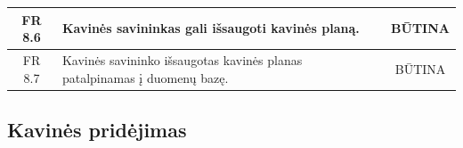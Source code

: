 \documentclass{VUMIFPSkursinis}
\begin{document}
\begin{center}
\begin{table}[H]
\begin{tabular}{|p{2cm}|p{}|p{}|}
		\multicolumn{1}{|c|}{FR 8.6}&
		{Kavinės savininkas gali išsaugoti kavinės planą.}&
		\multicolumn{1}{|c|}{BŪTINA}\\				
	\hline
	
		\multicolumn{1}{|c|}{FR 8.7}&
		{Kavinės savininko išsaugotas kavinės planas patalpinamas į duomenų bazę.}&
		\multicolumn{1}{|c|}{BŪTINA}\\				
	\hline
	
	\end{tabular}
	
	\label{table:KavinėsPlanavimas}
	\end{table}
	
	
\end{center}

\pagebreak

\subsection{Kavinės pridėjimas}
\end{document}
